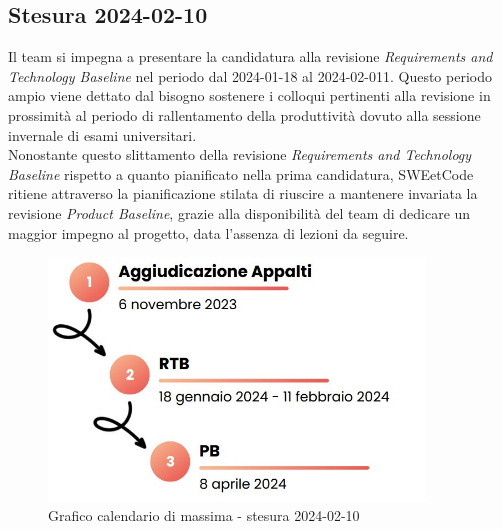\documentclass[10pt, a4paper]{article}
\begin{document}
{{{{{{\subsection{Stesura 2024-02-10}
Il team si impegna a presentare la candidatura alla revisione \textit{Requirements and Technology Baseline} nel periodo dal 2024-01-18 al 2024-02-011. Questo periodo ampio viene dettato dal bisogno sostenere i colloqui pertinenti alla revisione in prossimità al periodo di rallentamento della produttività dovuto alla sessione invernale di esami universitari. \\
Nonostante questo slittamento della revisione \textit{Requirements and Technology Baseline} rispetto a quanto pianificato nella prima candidatura, SWEetCode ritiene attraverso la pianificazione stilata di riuscire a mantenere invariata la revisione \textit{Product Baseline}, grazie alla disponibilità del team di dedicare un maggior impegno al progetto, data l'assenza di lezioni da seguire.
 \begin{figure}[H]
        \centering
        \includegraphics[width=10cm]{Calendario di massima - stesura 2024-02-10.png}
        \caption{Grafico calendario di massima - stesura 2024-02-10}
    \end{figure}

}}}}}}
\end{document}
